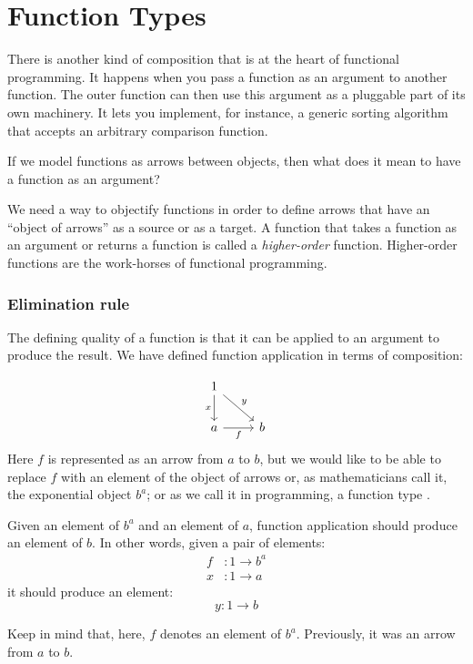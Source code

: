 \documentclass[DaoFP]{subfiles}
\begin{document}
\setcounter{chapter}{5}

\chapter{Function Types}

There is another kind of composition that is at the heart of functional programming. It happens when you pass a function as an argument to another function. The outer function can then use this argument as a pluggable part of its own machinery. It lets you implement, for instance, a generic sorting algorithm that accepts an arbitrary comparison function. 

If we model functions as arrows between objects, then what does it mean to have a function as an argument? 

We need a way to objectify functions in order to define arrows that have an ``object of arrows'' as a source or as a target. A function that takes a function as an argument or returns a function is called a \emph{higher-order} function. Higher-order functions are the work-horses of functional programming.

\subsection{Elimination rule}

The defining quality of a function is that it can be applied to an argument to produce the result. We have defined function application in terms of composition:

\[
 \begin{tikzcd}
 1
 \arrow[d, "x"']
 \arrow[rd, "y"]
 \\
 a
 \arrow[r, "f"']
& b
 \end{tikzcd}
\]
Here $f$ is represented as an arrow from $a$ to $b$, but we would like to be able to replace $f$ with an element of the object of arrows or, as mathematicians call it, the exponential object $b^a$; or as we call it in programming, a function type . 

Given an element of $b^a$ and an element of $a$, function application should produce an element of $b$. In other words, given a pair of elements:
\begin{align*}
f &\colon 1 \to b^a \\
x &\colon 1 \to a
\end{align*}
it should produce an element:
\[y \colon 1 \to b \]

Keep in mind that, here, $f$ denotes an element of $b^a$. Previously, it was an arrow from $a$ to $b$.
\end{document}
